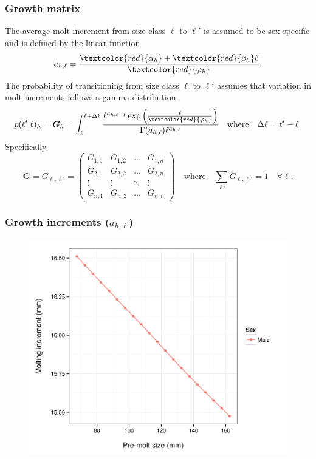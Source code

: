 \documentclass{beamer}
\begin{document}
\begin{frame}
\frametitle{Growth matrix}
The average molt increment from size class $\ell$ to $\ell'$ is assumed to be
sex-specific and is defined by the linear function
\begin{equation*}
  a_{h,\ell} = \frac{\textcolor{red}{\alpha_h} + \textcolor{red}{\beta_h}
    \ell}{\textcolor{red}{\varphi_h}}.
\end{equation*}
The probability of transitioning from size class $\ell$ to $\ell'$ assumes that
variation in molt increments follows a gamma distribution
\begin{equation*}
  p (\ell'|\ell)_h = \boldsymbol{G}_h = \int^{\ell + \Delta \ell}_\ell \frac{\ell^{a_{h,\ell-1}} \exp
    \left(\frac{\ell}{\textcolor{red}{\varphi_h}} \right)}{\Gamma (a_{h,\ell}) \ell^{a_{h,\ell}}}
  \quad \text{where} \quad \Delta \ell = \ell' - \ell.
\end{equation*}
Specifically
\begin{equation*}
  \boldsymbol{G} = G_{\ell,\ell'} = \left( \begin{array}{cccc}
      G_{1,1} & G_{1,2} & \hdots & G_{1,n} \\
      G_{2,1} & G_{2,2} & \hdots & G_{2,n} \\
      \vdots & \vdots & \ddots & \vdots \\
      G_{n,1} & G_{n,2} & \hdots & G_{n,n} \end{array} \right)
  \quad \text{where} \quad \sum_{\ell'} G_{\ell,\ell'} = 1 \quad \forall \ell.
\end{equation*}
\end{frame}


\begin{frame}
\frametitle{Growth increments ($a_{h,\ell}$)}
\begin{figure}[!htbp]
  \centering
  \includegraphics[width=0.75\linewidth]{../../examples/bbrkc/OneSex/figure/gi.png}
\end{figure}
\end{frame}
\end{document}

